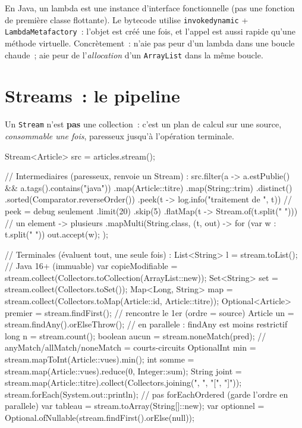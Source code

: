 \documentclass[12pt,a4paper,twoside,openright]{book}
\begin{document}
\begin{note}
En Java, un lambda est une instance d'interface fonctionnelle (pas une fonction de premi\`ere
classe flottante). Le bytecode utilise \verb|invokedynamic| + \verb|LambdaMetafactory|~:
l'objet est cr\'e\'e une fois, et l'appel est aussi rapide qu'une m\'ethode virtuelle. Concr\`etement~:
n'aie pas peur d'un lambda dans une boucle chaude~; aie peur de l'\emph{allocation} d'un
\verb|ArrayList| dans la m\^eme boucle.
\end{note}

\section{Streams~: le pipeline}

Un \verb|Stream| n'est \textbf{pas} une collection~: c'est un plan de calcul sur une source,
\emph{consommable une fois}, paresseux jusqu'\`a l'op\'eration terminale.

\begin{codejava}
Stream<Article> src = articles.stream();

// Intermediaires (paresseux, renvoie un Stream) :
src.filter(a -> a.estPublie() && a.tags().contains("java"))
   .map(Article::titre)
   .map(String::trim)
   .distinct()
   .sorted(Comparator.reverseOrder())
   .peek(t -> log.info("traitement de {}", t))        // peek = debug seulement
   .limit(20)
   .skip(5)
   .flatMap(t -> Stream.of(t.split(" ")))              // un element -> plusieurs
   .mapMulti(String.class, (t, out) -> { for (var w : t.split(" ")) { out.accept(w); } });

// Terminales (\'evaluent tout, une seule fois) :
List<String> l = stream.toList();                       // Java 16+ (immuable)
var copieModifiable = stream.collect(Collectors.toCollection(ArrayList::new));
Set<String> set = stream.collect(Collectors.toSet());
Map<Long, String> map = stream.collect(Collectors.toMap(Article::id, Article::titre));
Optional<Article> premier = stream.findFirst();          // rencontre le 1er (ordre = source)
Article un = stream.findAny().orElseThrow();              // en parallele : findAny est moins restrictif
long n = stream.count();
boolean aucun = stream.noneMatch(pred);                  // anyMatch/allMatch/noneMatch = courts-circuits
OptionalInt min = stream.mapToInt(Article::vues).min();
int somme = stream.map(Article::vues).reduce(0, Integer::sum);
String joint = stream.map(Article::titre).collect(Collectors.joining(", ", "[", "]"));
stream.forEach(System.out::println);                     // pas forEachOrdered (garde l'ordre en parallele)
var tableau = stream.toArray(String[]::new);
var optionnel = Optional.ofNullable(stream.findFirst().orElse(null));
\end{codejava}
\end{document}
